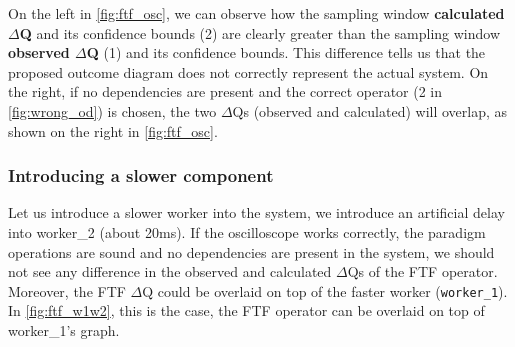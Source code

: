             On the left in \cref{fig:ftf_osc}, we can observe how the sampling window \textbf{calculated $\Delta$Q} and its confidence bounds (2) are clearly greater than the sampling window \textbf{observed $\Delta$Q} (1) and its confidence bounds. This difference tells us that the proposed outcome diagram does not correctly represent the actual system. On the right, if no dependencies are present and the correct operator (2 in \cref{fig:wrong_od}) is chosen, the two $\Delta$Qs (observed and calculated) will overlap, as shown on the right in \cref{fig:ftf_osc}.

                  \subsubsection{Introducing a slower component}
            Let us introduce a slower worker into the system, we introduce an artificial delay into worker\_2 (about 20ms). If the oscilloscope works correctly, the paradigm operations are sound and no dependencies are present in the system, we should not see any difference in the observed and calculated $\Delta$Qs of the FTF operator. Moreover, the FTF $\Delta$Q could be overlaid on top of the faster worker (\texttt{worker\_1}). In \cref{fig:ftf_w1w2}, this is the case, the FTF operator can be overlaid on top of worker\_1's graph. 


